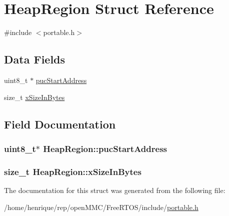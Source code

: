 \hypertarget{structHeapRegion}{\section{Heap\-Region Struct Reference}
\label{structHeapRegion}
}


{\ttfamily \#include $<$portable.\-h$>$}

\subsection*{Data Fields}
\begin{DoxyCompactItemize}
\item 
uint8\-\_\-t $\ast$ \hyperlink{structHeapRegion_aab323508c34642ebfb884a68441d97fc}{puc\-Start\-Address}
\item 
size\-\_\-t \hyperlink{structHeapRegion_a5933b0fd422e70a92ceef839b89a757f}{x\-Size\-In\-Bytes}
\end{DoxyCompactItemize}


\subsection{Field Documentation}
\hypertarget{structHeapRegion_aab323508c34642ebfb884a68441d97fc}{
\subsubsection[{puc\-Start\-Address}]{\setlength{\rightskip}{0pt plus 5cm}uint8\-\_\-t$\ast$ Heap\-Region\-::puc\-Start\-Address}}\label{structHeapRegion_aab323508c34642ebfb884a68441d97fc}
\hypertarget{structHeapRegion_a5933b0fd422e70a92ceef839b89a757f}{
\subsubsection[{x\-Size\-In\-Bytes}]{\setlength{\rightskip}{0pt plus 5cm}size\-\_\-t Heap\-Region\-::x\-Size\-In\-Bytes}}\label{structHeapRegion_a5933b0fd422e70a92ceef839b89a757f}


The documentation for this struct was generated from the following file\-:\begin{DoxyCompactItemize}
\item 
/home/henrique/rep/open\-M\-M\-C/\-Free\-R\-T\-O\-S/include/\hyperlink{portable_8h}{portable.\-h}\end{DoxyCompactItemize}
